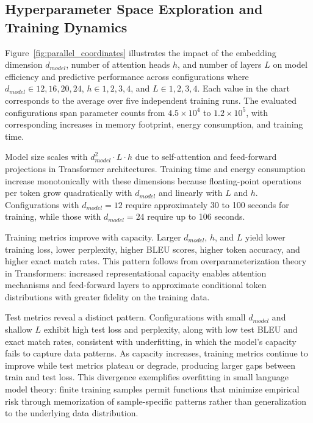 \documentclass{ieeeaccess}
\begin{document}
\subsection{Hyperparameter Space Exploration and Training Dynamics}

Figure~\ref{fig:parallel_coordinates} illustrates the impact of the embedding dimension $d_{model}$, number of attention heads $h$, and number of layers $L$ on model efficiency and predictive performance across configurations where $d_{model} \in {12, 16, 20, 24}$, $h \in {1, 2, 3, 4}$, and $L \in {1, 2, 3, 4}$. Each value in the chart corresponds to the average over five independent training runs. The evaluated configurations span parameter counts from $4.5 \times 10^4$ to $1.2 \times 10^5$, with corresponding increases in memory footprint, energy consumption, and training time.

Model size scales with $d_{model}^2 \cdot L \cdot h$ due to self-attention and feed-forward projections in Transformer architectures. Training time and energy consumption increase monotonically with these dimensions because floating-point operations per token grow quadratically with $d_{model}$ and linearly with $L$ and $h$. Configurations with $d_{model} = 12$ require approximately 30 to 100 seconds for training, while those with $d_{model} = 24$ require up to 106 seconds.

Training metrics improve with capacity. Larger $d_{model}$, $h$, and $L$ yield lower training loss, lower perplexity, higher BLEU scores, higher token accuracy, and higher exact match rates. This pattern follows from overparameterization theory in Transformers: increased representational capacity enables attention mechanisms and feed-forward layers to approximate conditional token distributions with greater fidelity on the training data.

Test metrics reveal a distinct pattern. Configurations with small $d_{model}$ and shallow $L$ exhibit high test loss and perplexity, along with low test BLEU and exact match rates, consistent with underfitting, in which the model's capacity fails to capture data patterns. As capacity increases, training metrics continue to improve while test metrics plateau or degrade, producing larger gaps between train and test loss. This divergence exemplifies overfitting in small language model theory: finite training samples permit functions that minimize empirical risk through memorization of sample-specific patterns rather than generalization to the underlying data distribution.
\end{document}
